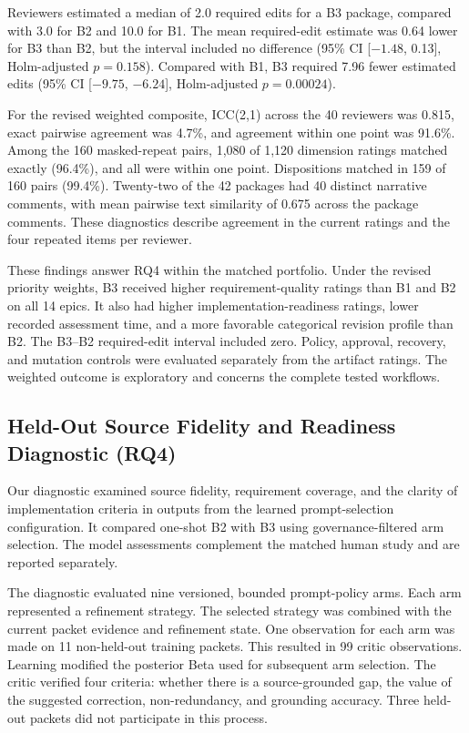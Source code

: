 \documentclass[manuscript,review]{acmart}
\begin{document}
Reviewers estimated a median of 2.0 required edits for a B3 package, compared with 3.0 for B2 and 10.0 for B1. The mean required-edit estimate was 0.64 lower for B3 than B2, but the interval included no difference (95\% CI [$-1.48$, 0.13], Holm-adjusted $p=0.158$). Compared with B1, B3 required 7.96 fewer estimated edits (95\% CI [$-9.75$, $-6.24$], Holm-adjusted $p=0.00024$).

For the revised weighted composite, ICC(2,1) across the 40 reviewers was 0.815, exact pairwise agreement was 4.7\%, and agreement within one point was 91.6\%. Among the 160 masked-repeat pairs, 1,080 of 1,120 dimension ratings matched exactly (96.4\%), and all were within one point. Dispositions matched in 159 of 160 pairs (99.4\%). Twenty-two of the 42 packages had 40 distinct narrative comments, with mean pairwise text similarity of 0.675 across the package comments. These diagnostics describe agreement in the current ratings and the four repeated items per reviewer.

These findings answer RQ4 within the matched portfolio. Under the revised priority weights, B3 received higher requirement-quality ratings than B1 and B2 on all 14 epics. It also had higher implementation-readiness ratings, lower recorded assessment time, and a more favorable categorical revision profile than B2. The B3--B2 required-edit interval included zero. Policy, approval, recovery, and mutation controls were evaluated separately from the artifact ratings. The weighted outcome is exploratory and concerns the complete tested workflows.

\subsection{Held-Out Source Fidelity and Readiness Diagnostic (RQ4)}\label{sec:heldout-source-diagnostic}

Our diagnostic examined source fidelity, requirement coverage, and the clarity of implementation criteria in outputs from the learned prompt-selection configuration. It compared one-shot B2 with B3 using governance-filtered arm selection. The model assessments complement the matched human study and are reported separately.

The diagnostic evaluated nine versioned, bounded prompt-policy arms. Each arm represented a refinement strategy. The selected strategy was combined with the current packet evidence and refinement state. One observation for each arm was made on 11 non-held-out training packets. This resulted in 99 critic observations. Learning modified the posterior Beta used for subsequent arm selection. The critic verified four criteria: whether there is a source-grounded gap, the value of the suggested correction, non-redundancy, and grounding accuracy. Three held-out packets did not participate in this process.
\end{document}
